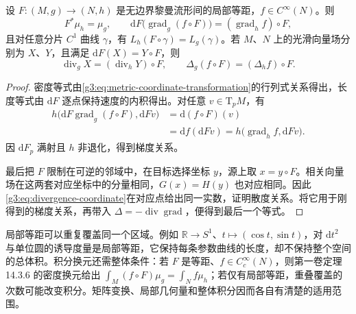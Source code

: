 \begin{proposition}
	\label{g3:prop:metric-naturality}
	设 \(F:(M,g)\to(N,h)\) 是无边界黎曼流形间的局部等距，\(f\in C^\infty(N)\)。则
	\[
		F^*\mu_h=\mu_g,\qquad
		\mathrm{d}F\bigl(\operatorname{grad}_g(f\circ F)\bigr)
		=(\operatorname{grad}_h f)\circ F,
	\]
	且对任意分片 \(C^1\) 曲线 \(\gamma\)，有 \(L_h(F\circ\gamma)=L_g(\gamma)\)。若 \(M\)、\(N\) 上的光滑向量场分别为 \(X\)、\(Y\)，且满足 \(\mathrm{d}F(X)=Y\circ F\)，则
	\[
		\operatorname{div}_gX=(\operatorname{div}_hY)\circ F,
		\qquad \Delta_g(f\circ F)=(\Delta_h f)\circ F.
	\]
\end{proposition}
\begin{proof}
	密度等式由\eqref{g3:eq:metric-coordinate-transformation}的行列式关系得出，长度等式由 \(\mathrm{d}F\) 逐点保持速度的内积得出。对任意 \(v\in\mathrm{T}_pM\)，有
	\[
		\begin{aligned}
			h\bigl(\mathrm{d}F\operatorname{grad}_g(f\circ F),\mathrm{d}Fv\bigr)
			&=\mathrm{d}(f\circ F)(v)\\
			&=\mathrm{d}f(\mathrm{d}Fv)
			=h\bigl(\operatorname{grad}_h f,\mathrm{d}Fv\bigr).
		\end{aligned}
	\]
	因 \(\mathrm{d}F_p\) 满射且 \(h\) 非退化，得到梯度关系。

	最后把 \(F\) 限制在可逆的邻域中，在目标选择坐标 \(y\)，源上取 \(x=y\circ F\)。相关向量场在这两套对应坐标中的分量相同，\(G(x)=H(y)\) 也对应相同。因此\eqref{g3:eq:divergence-coordinate}在对应点给出同一实数，证明散度关系。将它用于刚得到的梯度关系，再带入 \(\Delta=-\operatorname{div}\operatorname{grad}\)，便得到最后一个等式。
\end{proof}

局部等距可以重复覆盖同一个区域。例如 \(\mathbb R\to S^1\)、\(t\mapsto(\cos t,\sin t)\)，对 \(\mathrm{d}t^2\) 与单位圆的诱导度量是局部等距，它保持每条参数曲线的长度，却不保持整个空间的总体积。积分换元还需整体条件：若 \(F\) 是等距、\(f\in C_c^\infty(N)\)，则第一卷定理 14.3.6 的密度换元给出 \(\int_M(f\circ F)\mu_g=\int_Nf\mu_h\)；若仅有局部等距，重叠覆盖的次数可能改变积分。矩阵变换、局部几何量和整体积分因而各自有清楚的适用范围。
